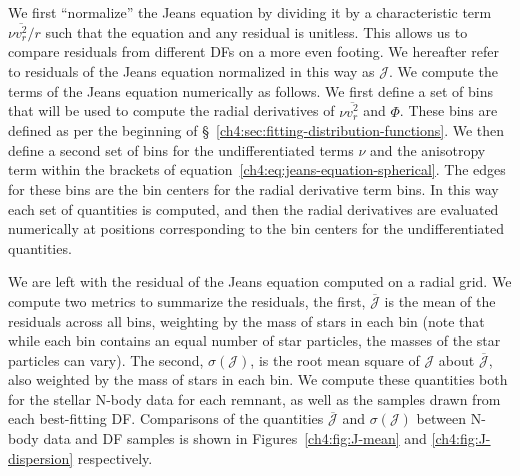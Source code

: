 We first ``normalize'' the Jeans equation by dividing it by a characteristic term $\nu\overline{v^{2}_{r}}/r$ such that the equation and any residual is unitless. This allows us to compare residuals from different DFs on a more even footing. We hereafter refer to residuals of the Jeans equation normalized in this way as $\mathcal{J}$. We compute the terms of the Jeans equation numerically as follows. We first define a set of bins that will be used to compute the radial derivatives of $\nu \overline{v^{2}_{r}}$ and $\Phi$. These bins are defined as per the beginning of \S~\ref{ch4:sec:fitting-distribution-functions}. We then define a second set of bins for the undifferentiated terms $\nu$ and the anisotropy term within the brackets of equation~\eqref{ch4:eq:jeans-equation-spherical}. The edges for these bins are the bin centers for the radial derivative term bins. In this way each set of quantities is computed, and then the radial derivatives are evaluated numerically at positions corresponding to the bin centers for the undifferentiated quantities.

We are left with the residual of the Jeans equation computed on a radial grid. We compute two metrics to summarize the residuals, the first, $\overline{\mathcal{J}}$ is the mean of the residuals across all bins, weighting by the mass of stars in each bin (note that while each bin contains an equal number of star particles, the masses of the star particles can vary). The second, $\sigma(\mathcal{J})$, is the root mean square of $\mathcal{J}$ about $\overline{\mathcal{J}}$, also weighted by the mass of stars in each bin. We compute these quantities both for the stellar N-body data for each remnant, as well as the samples drawn from each best-fitting DF. Comparisons of the quantities $\overline{\mathcal{J}}$ and $\sigma(\mathcal{J})$ between N-body data and DF samples is shown in Figures~\ref{ch4:fig:J-mean} and \ref{ch4:fig:J-dispersion} respectively.

